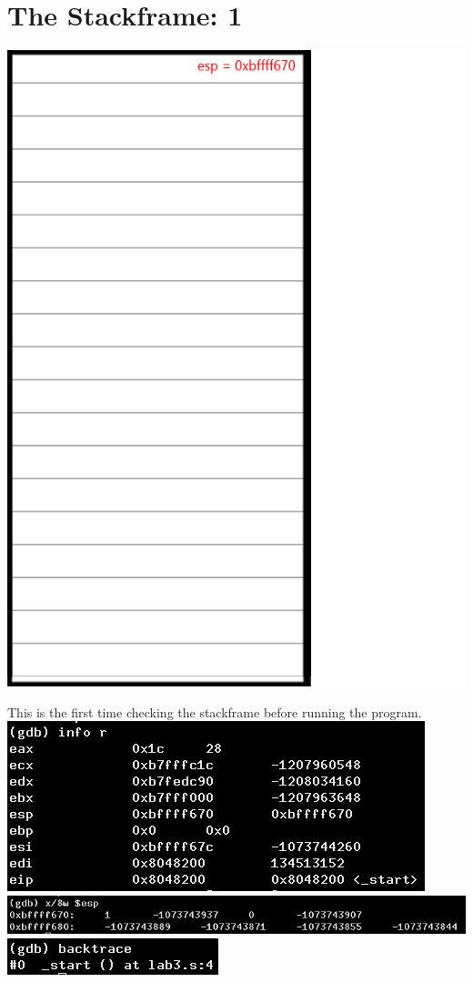 \documentclass{article}
\begin{document}
\section*{The Stackframe: 1}
\begin{minipage}{5cm}
\includegraphics[scale=0.3]{s1.png}
\end{minipage}
\begin{minipage}{8cm}
This is the first time checking the stackframe before running the program.\\
\includegraphics[scale=0.4]{info1.png} \\
\includegraphics[scale=0.3]{x1.png} \\
\includegraphics[scale=0.5]{bt1.png} \\
\end{minipage}
\clearpage
\end{document}
